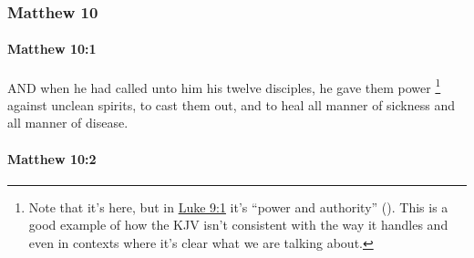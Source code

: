 	\subsubsection{Matthew 10} %
		\label{MATTHEW-10}
		
		\paragraph{Matthew 10:1} %
			\label{MATTHEW-10-1}

			AND when he had called unto him his twelve disciples, he gave them power%
				\footnote{%
					Note that it's  here, but in \hyperref[LUKE-9-1]{Luke 9:1} it's ``power and authority'' (). This is a good example of how the KJV isn't consistent with the way it handles  and  even in contexts where it's clear what we are talking about.
					}
			against unclean spirits, to cast them out, and to heal all manner of sickness and all manner of disease.

			\begin{framed}
			\scriptsize
				\begin{compactdesc}
					\item[SBLG]  \hyperref[EXOUSIA]{} 
				\end{compactdesc}
			\end{framed}

		\paragraph{Matthew 10:2} %
			\label{MATTHEW-10-2}

